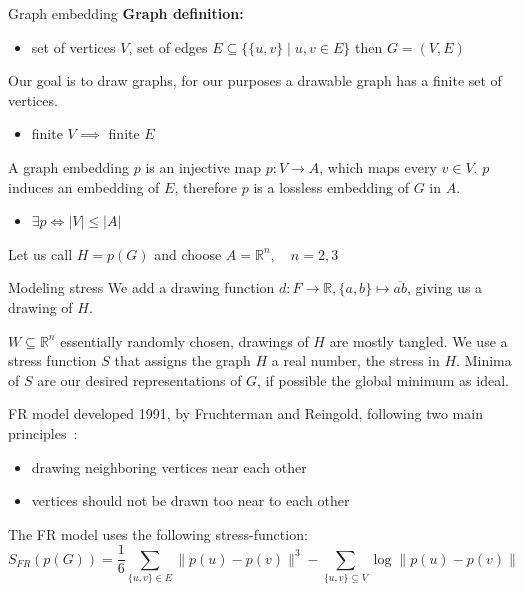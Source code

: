 \documentclass{beamer}
\begin{document}
\begin{frame}{Graph embedding}
    \textbf{Graph definition:}
    \begin{itemize}
        \item set of vertices $V$, set of edges $E \subseteq \{ \{ u,v \} \mid u,v \in E\}$ then $G=(V,E)$
    \end{itemize}
    Our goal is to draw graphs, for our purposes a drawable graph has a finite set of vertices.
    \begin{itemize}
        \item finite $V \implies$ finite $E$
    \end{itemize}
    A graph embedding $p$ is an injective map $p : V \to A$, which maps every $v \in V$. $p$ induces an embedding of $E$, therefore $p$ is a lossless embedding of $G$ in $A$.
    \begin{itemize}
        \item $\exists p \iff |V| \leq |A|$
    \end{itemize}
    
    Let us call $H=p(G)$ and choose $A= \mathbb{R}^n, \quad n=2,3$
\end{frame}

\begin{frame}{Modeling stress}
    We add a drawing function $d : F \to \mathbb{R}, \{ a,b \} \mapsto \overline{ab}$, giving us a drawing of $H$.
    
    $W \subseteq \mathbb{R}^n$ essentially randomly chosen, drawings of $H$ are mostly tangled.
    We use a stress function $S$ that assigns the graph $H$ a real number, the stress in $H$.
    Minima of $S$ are our desired representations of $G$, if possible the global minimum as ideal.
\end{frame}

\begin{frame}{FR model}
    developed 1991, by Fruchterman and Reingold, following two main principles~\cite{fr_paper}:
    \begin{itemize}
    \item drawing neighboring vertices near each other
    \item vertices should not  be drawn too near to each other
    \end{itemize}

    The FR model uses the following stress-function:
    \begin{equation}
        S_{FR}(p(G)) = \frac{1}{6}\sum_{\{u,v\} \in E}{\parallel p(u)-p(v) \parallel^3}
        - \sum_{\{u,v \} \subseteq V}{\log \parallel p(u)-p(v) \parallel}
    \end{equation}
\end{frame}
\end{document}
